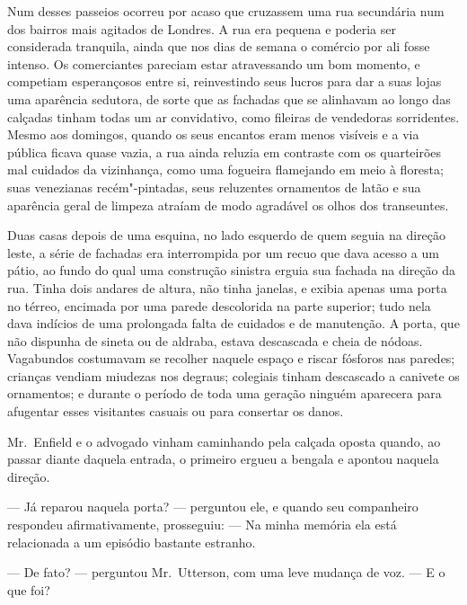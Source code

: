 Num desses passeios ocorreu por acaso que cruzassem uma rua secundária
num dos bairros mais agitados de Londres.  A rua era pequena e poderia
ser considerada tranquila, ainda que nos dias de semana o comércio por
ali fosse intenso.  Os comerciantes pareciam estar atravessando um bom
momento, e competiam esperançosos entre si, reinvestindo seus lucros
para dar a suas lojas uma aparência sedutora, de sorte que as fachadas
que se alinhavam ao longo das calçadas tinham todas um ar convidativo,
como fileiras de vendedoras sorridentes.  Mesmo aos domingos, quando os
seus encantos eram menos visíveis e a via pública ficava quase vazia, a
rua ainda reluzia em contraste com os quarteirões mal cuidados da
vizinhança, como uma fogueira flamejando em meio à floresta; suas
venezianas recém"-pintadas, seus reluzentes ornamentos de latão e sua
aparência geral de limpeza atraíam de modo agradável os olhos dos
transeuntes.

Duas casas depois de uma esquina, no lado esquerdo de quem seguia na
direção leste, a série de fachadas era interrompida por um recuo que
dava acesso a um pátio, ao fundo do qual uma construção sinistra erguia
sua fachada na direção da rua.  Tinha dois andares de altura, não tinha
janelas, e exibia apenas uma porta no térreo, encimada por uma parede
descolorida na parte superior; tudo nela dava indícios de uma
prolongada falta de cuidados e de manutenção.  A porta, que não
dispunha de sineta ou de aldraba, estava descascada e cheia de nódoas. 
Vagabundos costumavam se recolher naquele espaço e riscar fósforos nas
paredes; crianças vendiam miudezas nos degraus; colegiais tinham
descascado a canivete os ornamentos; e durante o período de toda uma
geração ninguém aparecera para afugentar esses visitantes casuais ou
para consertar os danos.

Mr.~Enfield e o advogado vinham caminhando pela calçada oposta quando,
ao passar diante daquela entrada, o primeiro ergueu a bengala e apontou
naquela direção.

--- Já reparou naquela porta? --- perguntou ele, e quando seu companheiro
respondeu afirmativamente, prosseguiu: --- Na minha memória ela está
relacionada a um episódio bastante estranho.

--- De fato? --- perguntou Mr.~Utterson, com uma leve mudança de voz. --- E
o que foi? 

